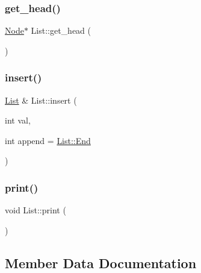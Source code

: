 \mbox{\label{classList_a8351c5dd882163133787a70911372dd6}} 
\subsubsection{\texorpdfstring{get\+\_\+head()}{get\_head()}}
{\footnotesize\ttfamily \mbox{\hyperlink{classNode}{Node}}$\ast$ List\+::get\+\_\+head (\begin{DoxyParamCaption}{ }\end{DoxyParamCaption})\hspace{0.3cm}{\ttfamily [inline]}}

\mbox{\label{classList_a7c7cd2ffe6d41eb9e9d61b00c9fbd787}} 
\subsubsection{\texorpdfstring{insert()}{insert()}}
{\footnotesize\ttfamily \mbox{\hyperlink{classList}{List}} \& List\+::insert (\begin{DoxyParamCaption}\item[{int}]{val,  }\item[{int}]{append = {\ttfamily \mbox{\hyperlink{classList_afbd07ca49b66b1233c4a6292454b5673}{List\+::\+End}}} }\end{DoxyParamCaption})}

\mbox{\label{classList_ac334b7866f8dd21f730442b2553df60f}} 
\subsubsection{\texorpdfstring{print()}{print()}}
{\footnotesize\ttfamily void List\+::print (\begin{DoxyParamCaption}{ }\end{DoxyParamCaption})}



\subsection{Member Data Documentation}
\mbox{\label{classList_a61fd49ab9baba79cdff2659b428d8bdf}} 
